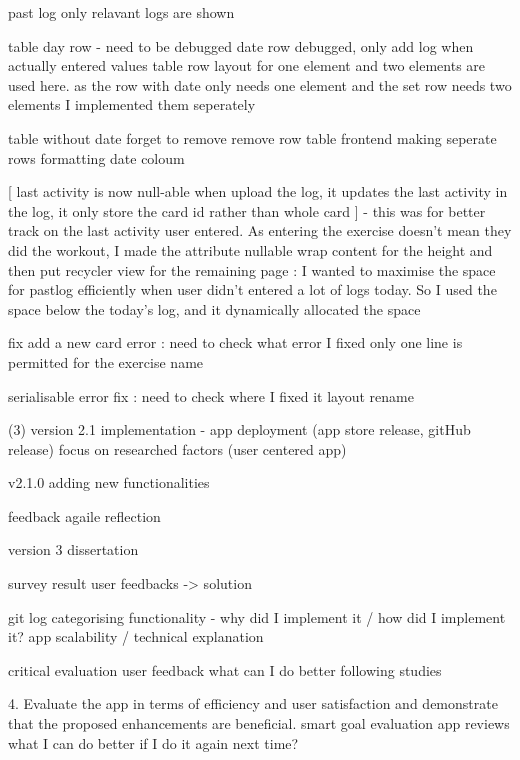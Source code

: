 past log
only relavant logs are shown

table day row - need to be debugged
date row debugged, only add log when actually entered values
    table row layout for one element and two elements are used here.
    as the row with date only needs one element 
    and the set row needs two elements
    I implemented them seperately

table without date
forget to remove remove row
table frontend
making seperate rows
formatting date coloum

[
    last activity is now null-able
    when upload the log, it updates the last activity
    in the log, it only store the card id rather than whole card
] - this was for better track on the last activity user entered. As entering the exercise doesn't mean they did the workout, I made the attribute nullable
wrap content for the height and then put recycler view for the remaining page : I wanted to maximise the space for pastlog efficiently when user didn't entered a lot of logs today. So I used the space below the today's log, and it dynamically allocated the space


fix add a new card error \todo : need to check what error I fixed
only one line is permitted for the exercise name


serialisable error fix \todo : need to check where I fixed it
layout rename




(3) version 2.1 implementation - app deployment (app store release, gitHub release)
focus on researched factors (user centered app)


\version v2.1.0 {
    adding new functionalities
} 














feedback agaile reflection


version 3 dissertation

survey result
user feedbacks -> solution


git log categorising
functionality - why did I implement it / how did I implement it?
app scalability / technical explanation



critical evaluation
user feedback
what can I do better
following studies

4. Evaluate the app in terms of efficiency and user satisfaction and demonstrate that the proposed enhancements are beneficial.
	smart goal evaluation
	app reviews
	what I can do better if I do it again next time?